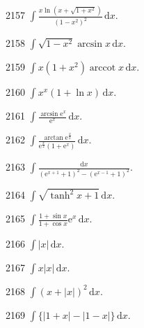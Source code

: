 \begin{prob}[S]{2157}
$\int \frac{x \ln(x + \sqrt{1 + x^2})}{(1 - x^2)^2} \,\mathrm{d}x$.
\end{prob}

\begin{prob}[S]{2158}
$\int \sqrt{1 - x^2} \arcsin x \,\mathrm{d}x$.
\end{prob}

\begin{prob}[S]{2159}
$\int x(1 + x^2)\operatorname{arccot} x \,\mathrm{d}x$.
\end{prob}

\begin{prob}[S]{2160}
$\int x^x(1 + \ln x) \,\mathrm{d}x$.
\end{prob}

\begin{prob}[S]{2161}
$\int \frac{\arcsin \mathrm{e}^x}{\mathrm{e}^x} \,\mathrm{d}x$.
\end{prob}

\begin{prob}[S]{2162}
$\int \frac{\arctan \mathrm{e}^{\frac{x}{2}}}{\mathrm{e}^{\frac{x}{2}}(1 + \mathrm{e}^x)} \,\mathrm{d}x$.
\end{prob}

\begin{prob}[S]{2163}
$\int \frac{\mathrm{d}x}{(\mathrm{e}^{x + 1} + 1)^2 - (\mathrm{e}^{x - 1} + 1)^2}$.
\end{prob}

\begin{prob}[S]{2164}
$\int \sqrt{\tanh^2 x + 1} \,\mathrm{d}x$.
\end{prob}

\begin{prob}[S]{2165}
$\int \frac{1 + \sin x}{1 + \cos x} \mathrm{e}^x \,\mathrm{d}x$.
\end{prob}

\begin{prob}[S]{2166}
$\int |x| \,\mathrm{d}x$.
\end{prob}

\begin{prob}[S]{2167}
$\int x|x| \,\mathrm{d}x$.
\end{prob}

\begin{prob}[S]{2168}
$\int (x + |x|)^2 \,\mathrm{d}x$.
\end{prob}

\begin{prob}[S]{2169}
$\int \{|1 + x| - |1 - x|\} \,\mathrm{d}x$.
\end{prob}

